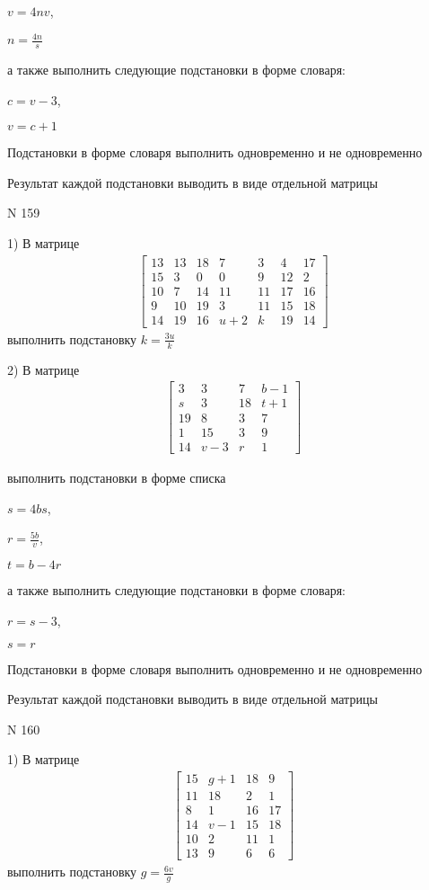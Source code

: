 \documentclass[11pt]{report}
\begin{document}
$v=4 n v$,

$n=\frac{4 n}{s}$

а также выполнить следующие подстановки в форме словаря:

$c=v - 3$,

$v=c + 1$


    Подстановки в форме словаря выполнить одновременно и не одновременно


    Результат каждой подстановки выводить в виде отдельной матрицы

\newpage
N 159


    1) В матрице
\begin{align*}
\left[\begin{matrix}13 & 13 & 18 & 7 & 3 & 4 & 17\\15 & 3 & 0 & 0 & 9 & 12 & 2\\10 & 7 & 14 & 11 & 11 & 17 & 16\\9 & 10 & 19 & 3 & 11 & 15 & 18\\14 & 19 & 16 & u + 2 & k & 19 & 14\end{matrix}\right]
\end{align*}
выполнить подстановку $k=\frac{3 u}{k}$


    2) В матрице
\begin{align*}
\left[\begin{matrix}3 & 3 & 7 & b - 1\\s & 3 & 18 & t + 1\\19 & 8 & 3 & 7\\1 & 15 & 3 & 9\\14 & v - 3 & r & 1\end{matrix}\right]
\end{align*}

выполнить подстановки в форме списка

$s=4 b s$,

$r=\frac{5 b}{v}$,

$t=b - 4 r$

а также выполнить следующие подстановки в форме словаря:

$r=s - 3$,

$s=r$


    Подстановки в форме словаря выполнить одновременно и не одновременно


    Результат каждой подстановки выводить в виде отдельной матрицы

\newpage
N 160


    1) В матрице
\begin{align*}
\left[\begin{matrix}15 & g + 1 & 18 & 9\\11 & 18 & 2 & 1\\8 & 1 & 16 & 17\\14 & v - 1 & 15 & 18\\10 & 2 & 11 & 1\\13 & 9 & 6 & 6\end{matrix}\right]
\end{align*}
выполнить подстановку $g=\frac{6 v}{g}$
\end{document}
